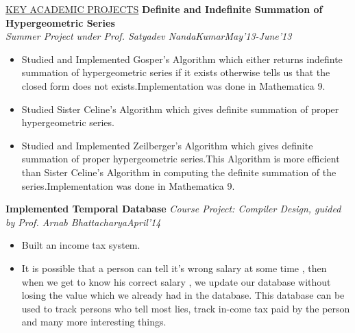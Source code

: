 \documentclass[10pt]{res}
\begin{document}
\begin{resume}
\begin{section}{\underline{KEY ACADEMIC PROJECTS}}
\vspace{0.2in}
{\bf Definite and Indefinite Summation of Hypergeometric Series}\\
\vspace{0.1in}
\textit{Summer Project under Prof. Satyadev NandaKumar\hfill May'13-June'13}
\vspace{0.1in}
\begin{itemize}
\item{
Studied and Implemented Gosper's Algorithm which either returns indefinte summation of hypergeometric series if it exists otherwise tells us that the closed form does not exists.Implementation was done in Mathematica 9.
}
\item{
Studied Sister Celine's Algorithm which gives definite summation of proper hypergeometric series.
}
\item{
Studied and Implemented Zeilberger's Algorithm which gives definite summation of proper hypergeometric series.This Algorithm is more efficient than Sister Celine's Algorithm in computing the definite summation of the series.Implementation was done in Mathematica 9.
}
\end{itemize}
{\bf Implemented Temporal Database}
\vspace{0.1in}
\textit{Course Project: Compiler Design, guided by Prof. Arnab Bhattacharya\hfill April'14}
\vspace{0.1in}
\begin{itemize}
\item{
Built an income tax system.
}
\item{
It is possible that a person can tell it’s wrong salary at some time , then when we get to know his correct salary , we update our database without losing the value which we already had in the database. This database can be used to track persons who tell most lies, track in-come tax paid by the person and many more interesting things.
}
\end{itemize}


\end{section}
\end{resume}
\end{document}

